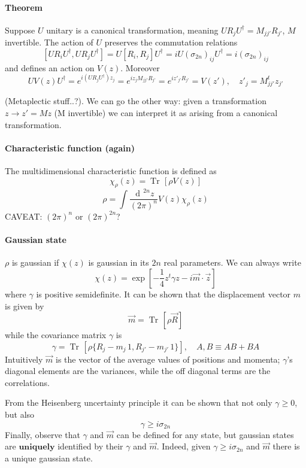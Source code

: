 \documentclass[a4paper, 11pt]{article}
\newcommand{\dd}{\mathop{\mathrm{d}\!}{}}
\newcommand{\Tr}{\mathop{\mathrm{Tr}\!}{}}
\begin{document}
	\paragraph{Theorem}
	Suppose $U$ unitary is a canonical transformation, meaning $U R_j U^\dagger = M_{jj'} R_{j'}$, $M$ invertible.
	The action of $U$ preserves the commutation relations
	\[ [UR_iU^\dagger, UR_jU^\dagger] = U [R_i, R_j] U^\dagger = i U (\sigma_{2n})_{ij} U^\dagger = i (\sigma_{2n})_{ij} \]
	and defines an action on $V(z)$. Moreover
	\[ UV(z)U^\dagger = e^{i (UR_jU^\dagger) z_j} = e^{i z_j M_{jj'} R_{j'}} = e^{i z'_{j'} R_{j'}}=V(z'),\quad z'_{j} = M^t_{jj'} z_{j'} \]
	
	(Metaplectic stuff..?). We can go the other way: given a transformation $z\rightarrow z'=Mz$ (M invertible) we can interpret it as arising from a canonical transformation.
	
	\paragraph{Characteristic function (again)}
	The multidimensional characteristic function is defined as
	\[ \chi_\rho(z) = \Tr\left[ \rho V(z) \right] \]
	\[ \rho = \int \dfrac{\dd^{2n} z}{(2\pi)^n} V(z) \chi_\rho(z) \]
	CAVEAT: $(2\pi)^n$ or $(2\pi)^{2n}$?
	\paragraph{Gaussian state}
	$\rho$ is gaussian if $\chi(z)$ is gaussian in its $2n$ real parameters. We can always write
	\[ \chi(z) = \exp\left[ -\frac{1}{4} z^t \gamma z - i\vec{m}\cdot\vec{z} \right] \]
	where $\gamma$ is positive semidefinite. It can be shown that the displacement vector $m$ is given by
	\[ \vec{m} = \Tr[\rho \vec{R}] \]
	while the covariance matrix $\gamma$ is
	\[ \gamma = \Tr\left[ \rho \{R_j-m_j\,1, R_{j'}-m_{j'}\,1\} \right],\quad {A,B} \equiv AB+BA \]
	Intuitively $\vec{m}$ is the vector of the average values of positions and momenta; $\gamma$'s diagonal elements are the variances, while the off diagonal terms are the correlations.
	
	From the Heisenberg uncertainty principle it can be shown that not only $\gamma\ge 0$, but also
	\[ \gamma \ge i \sigma_{2n} \]
	Finally, observe that $\gamma$ and $\vec{m}$ can be defined for any state, but gaussian states are $\mathbf{uniquely}$ identified by their $\gamma$ and $\vec{m}$. Indeed, given $\gamma \ge i \sigma_{2n}$ and $\vec{m}$ there is a unique gaussian state.
	
\end{document}
